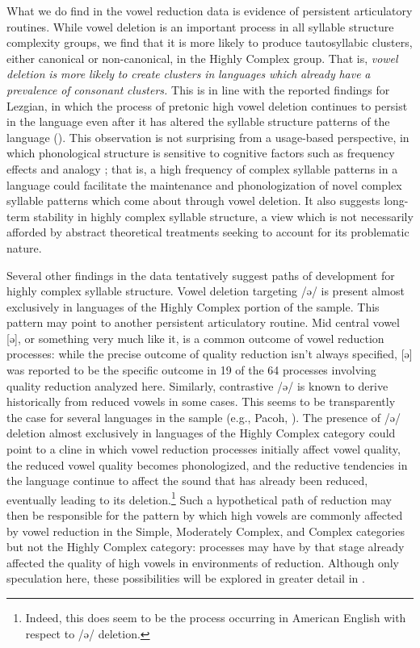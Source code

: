  What we do find in the vowel reduction data is evidence of persistent articulatory routines. While vowel deletion is an important process in all syllable structure complexity groups, we find that it is more likely to produce tautosyllabic clusters, either canonical or non-canonical, in the Highly Complex group. That is, \textit{vowel} \textit{deletion} \textit{is} \textit{more} \textit{likely} \textit{to} \textit{create} \textit{clusters} \textit{in} \textit{languages} \textit{which} \textit{already} \textit{have} \textit{a} \textit{prevalence} \textit{of} \textit{consonant} \textit{clusters.} This is in line with the reported findings for Lezgian, in which the process of pretonic high vowel deletion continues to persist in the language even after it has altered the syllable structure patterns of the language (\citealt{ChitoranBabaliyeva2007}). This observation is not surprising from a usage-based perspective, in which phonological structure is sensitive to cognitive factors such as frequency effects and analogy \citep{Bybee2001}; that is, a high frequency of complex syllable patterns in a language could facilitate the maintenance and phonologization of novel complex syllable patterns which come about through vowel deletion. It also suggests long-term stability in highly complex syllable structure, a view which is not necessarily afforded by abstract theoretical treatments seeking to account for its problematic nature.

  Several other findings in the data tentatively suggest paths of development for highly complex syllable structure. Vowel deletion targeting /ə/ is present almost exclusively in languages of the Highly Complex portion of the sample. This pattern may point to another persistent articulatory routine. Mid central vowel [ə], or something very much like it, is a common outcome of vowel reduction processes: while the precise outcome of quality reduction isn’t always specified, [ə] was reported to be the specific outcome in 19 of the 64 processes involving quality reduction analyzed here. Similarly, contrastive /ə/ is known to derive historically from reduced vowels in some cases. This seems to be transparently the case for several languages in the sample (e.g., Pacoh, \citealt{Alves2000}). The presence of /ə/ deletion almost exclusively in languages of the Highly Complex category could point to a cline in which  vowel reduction processes initially affect vowel quality,  the reduced vowel quality becomes phonologized, and  the reductive tendencies in the language continue to affect the sound that has already been reduced, eventually leading to its deletion.\footnote{ \textrm{Indeed, this does seem to be the process occurring in American English with respect to /ə/ deletion.}} Such a hypothetical path of reduction may then be responsible for the pattern by which high vowels are commonly affected by vowel reduction in the Simple, Moderately Complex, and Complex categories but not the Highly Complex category: processes may have by that stage already affected the quality of high vowels in environments of reduction. Although only speculation here, these possibilities will be explored in greater detail in .

